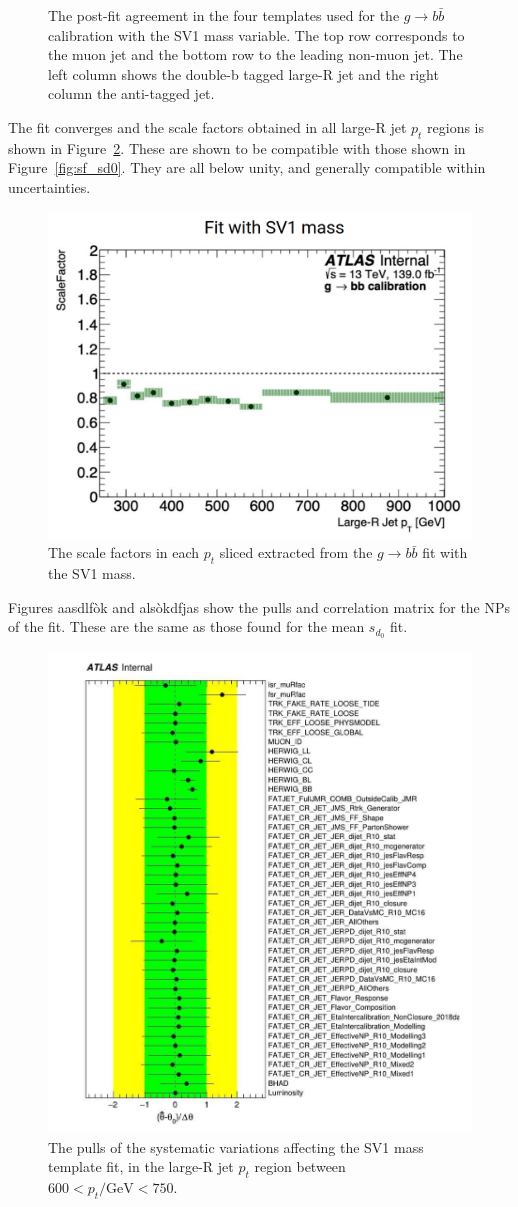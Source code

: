 \documentclass[10pt,a4paper]{book}
\begin{document}
\begin{figure}
    \caption{The post-fit agreement in the four templates used for the $g\rightarrow b \bar{b}$ calibration with the SV1 mass variable. The top row corresponds to the muon jet and the bottom row to the leading non-muon jet. The left column shows the double-b tagged large-R jet and the right column the anti-tagged jet.}
    \label{fig:postfit_sv1}
\end{figure}

The fit converges and the scale factors obtained in all large-R jet $p_t$ regions is shown in Figure~\ref{fig:sf_sv1}. These are shown to be compatible with those shown in Figure~\ref{fig:sf_sd0}. They are all below unity, and generally compatible within uncertainties.

\begin{figure}
    \centering
    \includegraphics[width=0.5\linewidth]{ftag/sv1Fit/scale_factor.png}
    \caption{The scale factors in each $p_t$ sliced extracted from the $g\rightarrow b\bar{b}$ fit with the SV1 mass.}
    \label{fig:sf_sv1}
\end{figure}

Figures aasdlfòk and alsòkdfjas show the pulls and correlation matrix for the NPs of the fit. These are the same as those found for the mean $s_{d_0}$ fit. 

\begin{figure}
    \centering
    \includegraphics[width=0.8\linewidth]{ftag/sv1Fit/pulls.png}
    \caption{The pulls of the systematic variations affecting the SV1 mass template fit, in the large-R jet $p_t$ region between $600 < p_t/\text{GeV} < 750$.}
    \label{fig:pulls}
\end{figure}
\end{document}
